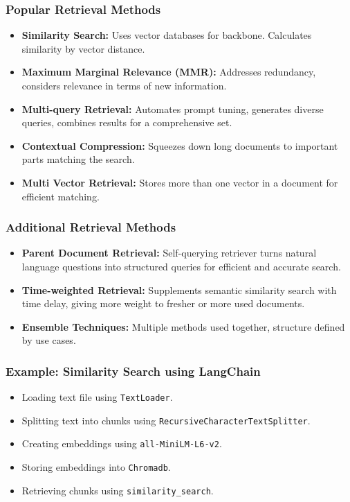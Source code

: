 \begin{frame}[fragile]\frametitle{Popular Retrieval Methods}
\begin{itemize}
    \item \textbf{Similarity Search:} Uses vector databases for backbone. Calculates similarity by vector distance.
    \item \textbf{Maximum Marginal Relevance (MMR):} Addresses redundancy, considers relevance in terms of new information.
    \item \textbf{Multi-query Retrieval:} Automates prompt tuning, generates diverse queries, combines results for a comprehensive set.
    \item \textbf{Contextual Compression:} Squeezes down long documents to important parts matching the search.
    \item \textbf{Multi Vector Retrieval:} Stores more than one vector in a document for efficient matching.
\end{itemize}
\end{frame}

\begin{frame}[fragile]\frametitle{Additional Retrieval Methods}
\begin{itemize}
    \item \textbf{Parent Document Retrieval:} Self-querying retriever turns natural language questions into structured queries for efficient and accurate search.
    \item \textbf{Time-weighted Retrieval:} Supplements semantic similarity search with time delay, giving more weight to fresher or more used documents.
    \item \textbf{Ensemble Techniques:} Multiple methods used together, structure defined by use cases.
\end{itemize}
\end{frame}

\begin{frame}[fragile]\frametitle{Example: Similarity Search using LangChain}
\begin{itemize}
    \item Loading text file using \texttt{TextLoader}.
    \item Splitting text into chunks using \texttt{RecursiveCharacterTextSplitter}.
    \item Creating embeddings using \texttt{all-MiniLM-L6-v2}.
    \item Storing embeddings into \texttt{Chromadb}.
    \item Retrieving chunks using \texttt{similarity\_search}.
\end{itemize}
\end{frame}

